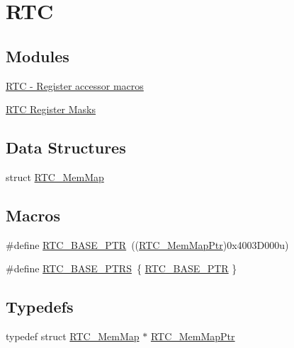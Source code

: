 \hypertarget{group___r_t_c___peripheral}{}\section{R\+TC}
\label{group___r_t_c___peripheral}
\subsection*{Modules}
\begin{DoxyCompactItemize}
\item 
\hyperlink{group___r_t_c___register___accessor___macros}{R\+T\+C -\/ Register accessor macros}
\item 
\hyperlink{group___r_t_c___register___masks}{R\+T\+C Register Masks}
\end{DoxyCompactItemize}
\subsection*{Data Structures}
\begin{DoxyCompactItemize}
\item 
struct \hyperlink{struct_r_t_c___mem_map}{R\+T\+C\+\_\+\+Mem\+Map}
\end{DoxyCompactItemize}
\subsection*{Macros}
\begin{DoxyCompactItemize}
\item 
\#define \hyperlink{group___r_t_c___peripheral_ga6455e2b767b4b224b4f00b50e87a2441}{R\+T\+C\+\_\+\+B\+A\+S\+E\+\_\+\+P\+TR}~((\hyperlink{group___r_t_c___peripheral_gac92da66fe1171e5751505df29917b152}{R\+T\+C\+\_\+\+Mem\+Map\+Ptr})0x4003\+D000u)
\item 
\#define \hyperlink{group___r_t_c___peripheral_ga426dff8af34f3304d58b5bed5a54e583}{R\+T\+C\+\_\+\+B\+A\+S\+E\+\_\+\+P\+T\+RS}~\{ \hyperlink{group___r_t_c___peripheral_ga6455e2b767b4b224b4f00b50e87a2441}{R\+T\+C\+\_\+\+B\+A\+S\+E\+\_\+\+P\+TR} \}
\end{DoxyCompactItemize}
\subsection*{Typedefs}
\begin{DoxyCompactItemize}
\item 
typedef struct \hyperlink{struct_r_t_c___mem_map}{R\+T\+C\+\_\+\+Mem\+Map} $\ast$ \hyperlink{group___r_t_c___peripheral_gac92da66fe1171e5751505df29917b152}{R\+T\+C\+\_\+\+Mem\+Map\+Ptr}
\end{DoxyCompactItemize}


